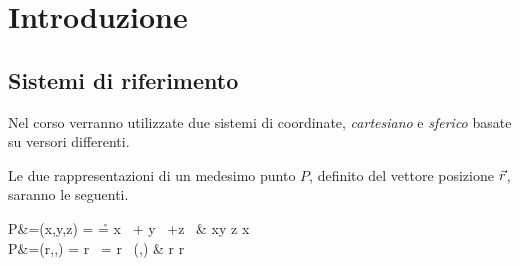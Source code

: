 \chapter{Introduzione}
\section{Sistemi di riferimento}
Nel corso verranno utilizzate due sistemi di coordinate, \emph{cartesiano} e \emph{sferico} basate su versori differenti.

Le due rappresentazioni di un medesimo punto $P$, definito del vettore posizione $\vec{r}$, saranno le seguenti.
\begin{esp}
	P&=(x,y,z) = \r = x \,  + y \,  +z \, 
	&  x\perp y \perp z \perp x \\
	P&=(r,\theta,\phi) = r \,  = r \, (\theta,\phi)
		&  r \perp \theta \perp \phi \perp r
	\label{eq:riferimento}
\end{esp}

